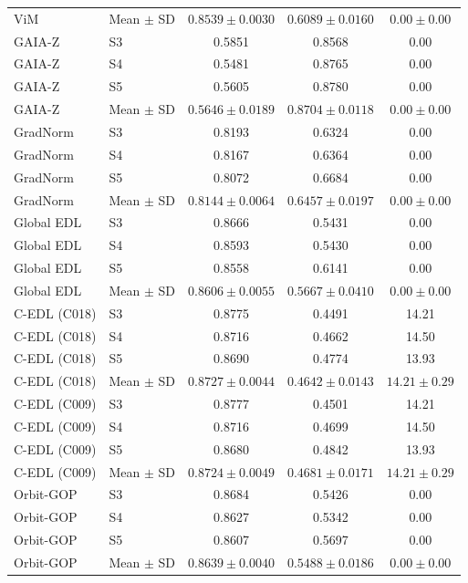 \begin{longtable}{@{}llccc@{}}
ViM & Mean $\pm$ SD & $0.8539 \pm 0.0030$ & $0.6089 \pm 0.0160$ & $0.00 \pm 0.00$ \\
GAIA-Z & S3 & 0.5851 & 0.8568 & 0.00 \\
GAIA-Z & S4 & 0.5481 & 0.8765 & 0.00 \\
GAIA-Z & S5 & 0.5605 & 0.8780 & 0.00 \\
GAIA-Z & Mean $\pm$ SD & $0.5646 \pm 0.0189$ & $0.8704 \pm 0.0118$ & $0.00 \pm 0.00$ \\
GradNorm & S3 & 0.8193 & 0.6324 & 0.00 \\
GradNorm & S4 & 0.8167 & 0.6364 & 0.00 \\
GradNorm & S5 & 0.8072 & 0.6684 & 0.00 \\
GradNorm & Mean $\pm$ SD & $0.8144 \pm 0.0064$ & $0.6457 \pm 0.0197$ & $0.00 \pm 0.00$ \\
Global EDL & S3 & 0.8666 & 0.5431 & 0.00 \\
Global EDL & S4 & 0.8593 & 0.5430 & 0.00 \\
Global EDL & S5 & 0.8558 & 0.6141 & 0.00 \\
Global EDL & Mean $\pm$ SD & $0.8606 \pm 0.0055$ & $0.5667 \pm 0.0410$ & $0.00 \pm 0.00$ \\
C-EDL (C018) & S3 & 0.8775 & 0.4491 & 14.21 \\
C-EDL (C018) & S4 & 0.8716 & 0.4662 & 14.50 \\
C-EDL (C018) & S5 & 0.8690 & 0.4774 & 13.93 \\
C-EDL (C018) & Mean $\pm$ SD & $0.8727 \pm 0.0044$ & $0.4642 \pm 0.0143$ & $14.21 \pm 0.29$ \\
C-EDL (C009) & S3 & 0.8777 & 0.4501 & 14.21 \\
C-EDL (C009) & S4 & 0.8716 & 0.4699 & 14.50 \\
C-EDL (C009) & S5 & 0.8680 & 0.4842 & 13.93 \\
C-EDL (C009) & Mean $\pm$ SD & $0.8724 \pm 0.0049$ & $0.4681 \pm 0.0171$ & $14.21 \pm 0.29$ \\
Orbit-GOP & S3 & 0.8684 & 0.5426 & 0.00 \\
Orbit-GOP & S4 & 0.8627 & 0.5342 & 0.00 \\
Orbit-GOP & S5 & 0.8607 & 0.5697 & 0.00 \\
Orbit-GOP & Mean $\pm$ SD & $0.8639 \pm 0.0040$ & $0.5488 \pm 0.0186$ & $0.00 \pm 0.00$ \\
\end{longtable}
\endgroup

\clearpage
